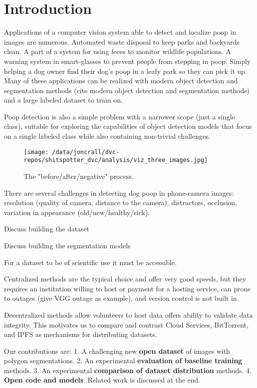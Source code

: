 \documentclass[10pt,twocolumn,letterpaper]{article}
\begin{document}
\section{Introduction}
\label{sec:intro}

Applications of a computer vision system able to detect and localize poop in
images are numerous.
Automated waste disposal to keep parks and backyards clean.
A part of a system for using feces to monitor wildlife populations.
A warning system in smart-glasses to prevent people from stepping in poop.
Simply helping a dog owner find their dog's poop in a leafy park so they can pick it up.
Many of these applications can be realized with modern object detection and
segmentation methods (cite modern object detection and segmentation methods)
and a large labeled dataset to train on.

Poop detection is also a simple problem with a narrower scope (just a single
class), suitable for exploring the capabilities of object detection models that
focus on a single labeled class while also containing non-trivial challenges.


\begin{figure}[h]
\centering
\texttt{[image: /data/joncrall/dvc-repos/shitspotter\_dvc/analysis/viz\_three\_images.jpg]}
\caption[]{
    The "before/after/negative" process.
}
\label{fig:AllPolygons}
\end{figure}

There are several challenges in detecting dog poop in phone-camera images:
resolution (quality of camera, distance to the camera),
distractors,
occlusion,
variation in appearance (old/new/healthy/sick).

Discuss building the dataset

Discuss building the segmentation models

For a dataset to be of scientific use it must be accessible. 

Centralized methods are the typical choice and offer very good speeds, 
but they requires an institution willing to host or payment for a hosting service,
can prone to outages (give VGG outage as example),
and version control is not built in.

Decentralized methods allow volunteers to host data offers ability to validate
data integrity. This motivates us to compare and contrast Cloud Services,
BitTorrent, and IPFS as mechanisms for distributing datasets.

Our contributions are:
1. A challenging new \textbf{open dataset} of images with polygon segmentations.
2. An experimental \textbf{evaluation of baseline training} methods.
3. An experimental \textbf{comparison of dataset distribution} methods.
4. \textbf{Open code and models}.
Related work is discussed at the end.
\end{document}
